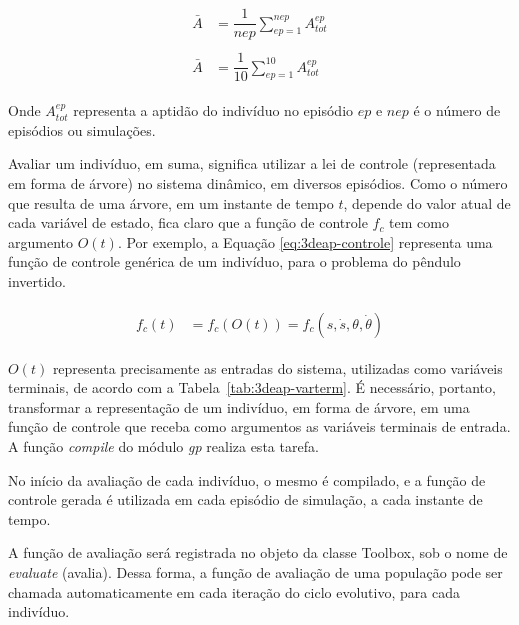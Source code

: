 \begin{align}\label{eq:3deap-media}
\begin{split}
\bar{A} &= \dfrac{1}{nep}\sum_{ep=1}^{nep} A_{tot}^{ep}\\\\
\bar{A} &= \dfrac{1}{10}\sum_{ep=1}^{10} A_{tot}^{ep}
\end{split}
\end{align}

Onde $A_{tot}^{ep}$ representa a aptidão do indivíduo no episódio $ep$ e $nep$ é o número de episódios ou simulações.

Avaliar um indivíduo, em suma, significa utilizar a lei de controle (representada em forma de árvore) no sistema dinâmico, em diversos episódios. Como o número que resulta de uma árvore, em um instante de tempo $t$, depende do valor atual de cada variável de estado, fica claro que a função de controle $f_c$ tem como argumento $O(t)$. Por exemplo, a Equação \ref{eq:3deap-controle} representa uma função de controle genérica de um indivíduo, para o problema do pêndulo invertido.

\begin{align}\label{eq:3deap-controle}
\begin{split}
f_c(t) &= f_c(O(t)) = f_c(s, \dot{s}, \theta, \dot{\theta})
\end{split}
\end{align}

$O(t)$ representa precisamente as entradas do sistema, utilizadas como variáveis terminais, de acordo com a Tabela~\ref{tab:3deap-varterm}. É necessário, portanto, transformar a representação de um indivíduo, em forma de árvore, em uma função de controle que receba como argumentos as variáveis terminais de entrada. A função \textit{compile} do módulo \textit{gp} realiza esta tarefa.


No início da avaliação de cada indivíduo, o mesmo é compilado, e a função de controle gerada é utilizada em cada episódio de simulação, a cada instante de tempo.

A função de avaliação será registrada no objeto da classe Toolbox, sob o nome de \textit{evaluate} (avalia). Dessa forma, a função de avaliação de uma população pode ser chamada automaticamente em cada iteração do ciclo evolutivo, para cada indivíduo.

